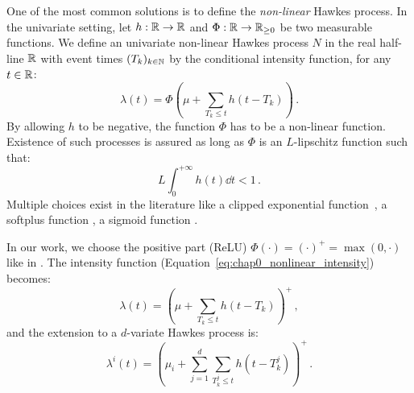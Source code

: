     One of the most common solutions is to define the \emph{non-linear} Hawkes process. In the univariate setting, let $h:{\mathbb R} \to {\mathbb R}$ and $\Phi:{\mathbb R}\to{\mathbb R}_{\geq 0}$ be two measurable functions. We define an univariate non-linear Hawkes process $N$ in the real half-line ${\mathbb R}$ with event times $(T_k)_{k\in{\mathbb N}}$ by the conditional intensity function, for any $t\in{\mathbb R}$:
    \begin{equation}\label{eq:chap0_nonlinear_intensity}
      \lambda(t) = \Phi\left(\mu + \sum_{T_k \leq t}{h(t-T_k)}\right)\,.
    \end{equation}
    By allowing $h$ to be negative, the function $\Phi$ has to be a non-linear function. Existence of such processes is assured as long as $\Phi$ is an $L$-lipschitz function \parencite[Theorem 1]{Bremaud1996} such that:
    \[L\int_{0}^{+\infty}{h(t)\dd t} <1\,.\]
    Multiple choices exist in the literature like a clipped exponential function \parencite{Chornoboy1988,Carstensen2010,Gerhard2017},
    a softplus function \parencite{Mei2017},%
    a sigmoid function \parencite{Menon2018}.
    
    In our work, we choose the positive part (ReLU) $\Phi(\cdot) = (\cdot)^+ = \max(0, \cdot)$ like in \textcite{Lemonnier2014, Hansen2015, Lu2018, Costa2020}.
    The intensity function (Equation~\eqref{eq:chap0_nonlinear_intensity}) becomes:
    \begin{equation}\label{eq:chap0_nonlinear_univariate_intensity}
      \lambda(t) = \left(\mu + \sum_{T_k \leq t}{h(t-T_k)}\right)^+\,,
    \end{equation}
    and the extension to a $d$-variate Hawkes process is:
    \begin{equation}\label{eq:chap0_nonlinear_multivariate_intensity}
      \lambda^i(t) = \left(\mu_i + \sum_{j=1}^{d}\sum_{T_k^j \leq t}{h(t-T_k^j)}\right)^+\,.
    \end{equation}


